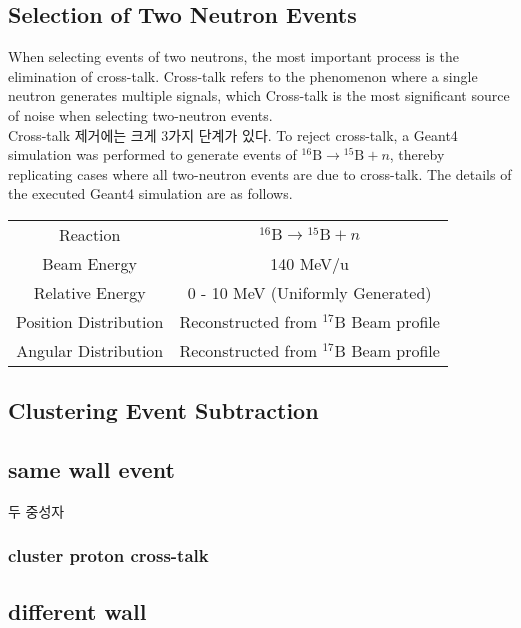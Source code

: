 \subsection {Selection of Two Neutron Events}
When selecting events of two neutrons, the most important process is the elimination of cross-talk. Cross-talk refers to the phenomenon where a single neutron generates multiple signals, which  Cross-talk is the most significant source of noise when selecting two-neutron events. \\
Cross-talk 제거에는 크게 3가지 단계가 있다. 
To reject cross-talk, a Geant4 simulation was performed to generate events of ${}^{16}\text{B} \to {}^{15}\text{B}+n$, thereby replicating cases where all two-neutron events are due to cross-talk. The details of the executed Geant4 simulation are as follows.
\begin{center}
    \begin{tabular}[h]{c|c}
        \hline \hline
        Reaction & ${}^{16}\text{B} \to {}^{15}\text{B}+n$ \\
        Beam Energy & 140 MeV/u\\
        Relative Energy & 0 - 10 MeV (Uniformly Generated)\\
        Position Distribution & Reconstructed from ${}^{17}$B Beam profile\\
        Angular Distribution & Reconstructed from ${}^{17}$B Beam profile \\
        \hline \hline
    \end{tabular}
\end{center}
\subsection{Clustering Event Subtraction}

\subsection{same wall event}
두 중성자

\subsubsection{cluster proton cross-talk}


\subsection{different wall}
